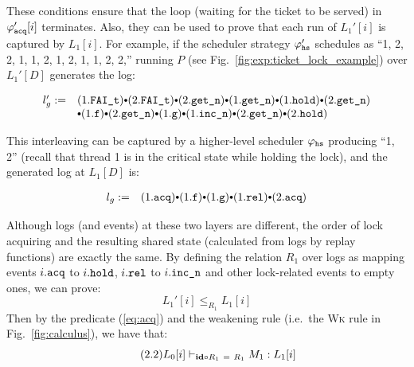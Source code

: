 \noindent These conditions ensure that the loop (waiting for the ticket 
to be served) in $\varphi_{{\mathrm{\texttt{acq}}}}'[i]$  terminates. Also, they can be used to prove that each run of $L_1'[i]$ is captured by $L_1[i]$. For example, if the scheduler strategy  $\varphi_{{\mathrm{\texttt{hs}}}}'$ schedules as  ``1, 2, 2, 1, 1, 2, 1, 2, 1, 1, 2, 2,'' running $P$ (see Fig.~\ref{fig:exp:ticket_lock_example}) over $L_1'[D]$ generates the log:%

\begin{small}
\[
\begin{array}{rl}
l'_{g} := &
 (1.\incticket) \cons
(2.\incticket) \cons
(2.\getnow) \cons
(1.\getnow)  \cons 
 (1.\holdlock) \cons 
(2.\getnow) \\
&
\cons (1.\codeinmath{f})
\cons (2.\getnow)
\cons (1.\codeinmath{g})
\cons (1.\incnow) 
\cons (2.\getnow)
\cons (2.\holdlock) 
\end{array}
\]
\end{small}

\noindent This interleaving can be captured by a higher-level scheduler $\varphi_{{\mathrm{\texttt{hs}}}}$ producing ``1, 2'' (recall that thread 1 is in the critical state while holding the lock),
and the generated log at $L_1[D]$ is:%
\begin{small}
\[
\begin{array}{rl}
l_{g} := &
 (1.\codeinmath{acq})
\cons (1.\codeinmath{f})
\cons (1.\codeinmath{g})
\cons (1.\codeinmath{rel})
\cons 
 (2.\codeinmath{acq}) 
\end{array}
\]
\end{small}%
Although logs (and events) at these two layers are different, the order of lock acquiring and 
the resulting shared state (calculated from logs by replay functions) are exactly the same. By defining the relation $R_1$ over logs as mapping events $i.{\mathrm{\texttt{acq}}}$ to $i.{\mathrm{\texttt{hold}}}$, $i.{\mathrm{\texttt{rel}}}$  to $i.{\mathrm{\texttt{inc\_n}}}$ and other lock-related events to empty ones, we can prove:%
$$L_1'[i] \le_{R_1} L_1[i]$$
Then by the predicate (\ref{eq:acq}) and the weakening rule (i.e.\, the \textsc{Wk} rule in Fig.~\ref{fig:calculus}), we have that:%
\begin{equation}\label{eq:acq:h} \tag{2.2}
L_0[i] \vdash_{\textbf{id} \circ R_1\ =\ R_1} M_1 : L_1[i]
\end{equation}


